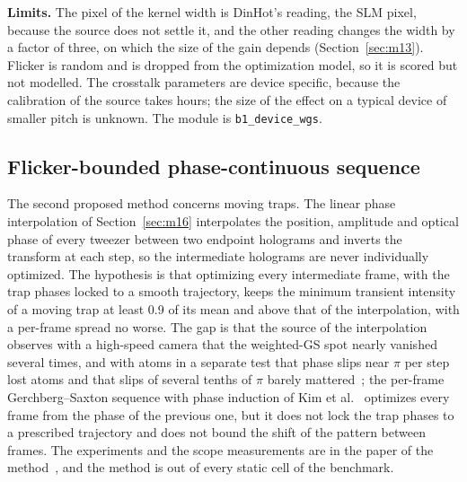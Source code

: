 \textbf{Limits.} The pixel of the kernel width is DinHot's reading, the SLM pixel, because the source does not settle it, and the other reading changes the width by a factor of three, on which the size of the gain depends (Section~\ref{sec:m13}). Flicker is random and is dropped from the optimization model, so it is scored but not modelled. The crosstalk parameters are device specific, because the calibration of the source takes hours; the size of the effect on a typical device of smaller pitch is unknown. The module is \texttt{b1\_device\_wgs}.

\subsection{Flicker-bounded phase-continuous sequence}\label{sec:b2}

The second proposed method concerns moving traps. The linear phase interpolation of Section~\ref{sec:m16} interpolates the position, amplitude and optical phase of every tweezer between two endpoint holograms and inverts the transform at each step, so the intermediate holograms are never individually optimized. The hypothesis is that optimizing every intermediate frame, with the trap phases locked to a smooth trajectory, keeps the minimum transient intensity of a moving trap at least 0.9 of its mean and above that of the interpolation, with a per-frame spread no worse. The gap is that the source of the interpolation observes with a high-speed camera that the weighted-GS spot nearly vanished several times, and with atoms in a separate test that phase slips near $\pi$ per step lost atoms and that slips of several tenths of $\pi$ barely mattered~\cite{lpi}; the per-frame Gerchberg--Saxton sequence with phase induction of Kim et al.~\cite{kim2019} optimizes every frame from the phase of the previous one, but it does not lock the trap phases to a prescribed trajectory and does not bound the shift of the pattern between frames. The experiments and the scope measurements are in the paper of the method~\cite{flickerpaper}, and the method is out of every static cell of the benchmark.

